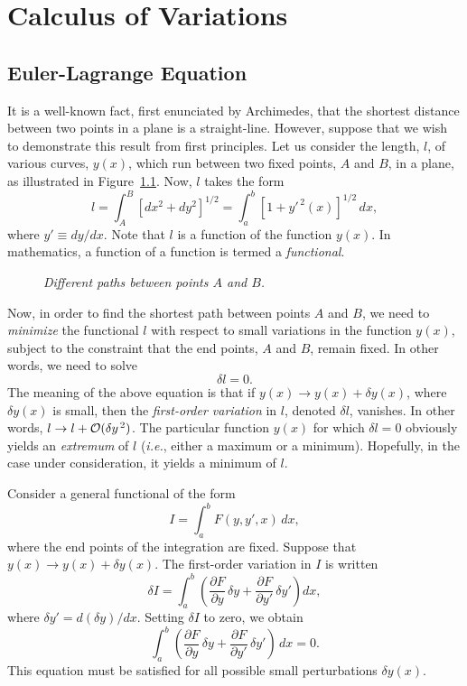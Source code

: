 \chapter{Calculus of Variations}\label{cvar}
\section{Euler-Lagrange Equation}\label{s11.2}
It is a well-known fact, first enunciated by Archimedes, that the shortest
distance between two points in a plane is a straight-line. However, suppose that
we wish to demonstrate this result from first principles. Let us consider the
length, $l$, of various curves, $y(x)$, which run between two fixed
points, $A$ and $B$, in a plane, as illustrated in Figure~\ref{calv}. Now, $l$ takes the form
\begin{equation}\label{e11.1}
l = \int_A^B [dx^2 + dy^2]^{1/2} = \int_a^b [1 + y'^{\,2}(x)]^{1/2}\,dx,
\end{equation}
where $y'\equiv dy/dx$. Note that $l$ is a function of the function $y(x)$.
In mathematics, a function of a function is  termed a {\em functional}. 

\begin{figure}[h]
\epsfysize=2.5in
\centerline{}
\caption{\em Different paths between points $A$ and $B$.}\label{calv}
\end{figure}

Now, in order to find the shortest path between points $A$ and $B$, we need to {\em minimize}\/ the functional $l$ with respect to small variations
in the function $y(x)$, subject to the constraint that the end points, $A$
and $B$, remain fixed. In other words, we need to solve
\begin{equation}
\delta l = 0.
\end{equation}
The meaning of the above equation is that if $y(x)\rightarrow y(x)+\delta y(x)$, where $\delta y(x)$ is small, then the {\em first-order variation} in $l$,
denoted $\delta l$, 
vanishes. In other words, $l\rightarrow l + {\cal O}(\delta y^{\,2})$. The particular function
$y(x)$ for which $\delta l =0$ obviously yields an {\em extremum}\/ of $l$ ({\em i.e.}, either a maximum or a minimum). Hopefully,
in the  case under consideration, 
it yields a minimum of $l$.

Consider a general functional of the form
\begin{equation}\label{e11.3}
I = \int_a^b F(y, y',x)\,dx,
\end{equation}
where the end points of the integration are fixed.
   Suppose that $y(x)\rightarrow
y(x)+\delta y(x)$. The first-order variation in $I$ is written
\begin{equation}
\delta I = \int_a^b\left(\frac{\partial F}{\partial y}\,\delta y+ \frac{\partial F}{\partial y'}\,\delta y'\right)dx,
\end{equation}
where $\delta y' = d(\delta y)/dx$.  Setting $\delta I$ to zero, we
obtain
\begin{equation}
\int_a^b\left(\frac{\partial F}{\partial y}\,\delta y+ \frac{\partial F}{\partial y'}\,\delta y'\right)\,dx = 0.
\end{equation}
This equation must be satisfied for all possible small perturbations $\delta y(x)$. 

